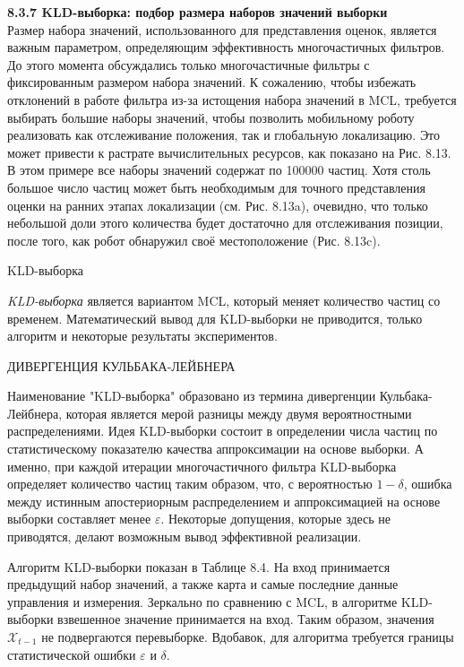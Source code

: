 \documentclass[10pt,a4paper]{article}
\begin{document}
\textbf{8.3.7	KLD-выборка: подбор размера наборов значений выборки}\\

Размер набора значений, использованного для представления оценок, является важным параметром, определяющим эффективность многочастичных фильтров. До этого момента обсуждались только многочастичные фильтры с фиксированным размером набора значений. К сожалению, чтобы избежать отклонений в работе фильтра из-за истощения набора значений в MCL, требуется выбирать большие наборы значений, чтобы позволить мобильному роботу реализовать как отслеживание положения, так и глобальную локализацию. Это может привести к растрате вычислительных ресурсов, как показано на Рис. 8.13. В этом примере все наборы значений содержат по 100000 частиц. Хотя столь большое число частиц может быть необходимым для точного представления оценки на ранних этапах локализации (см. Рис. 8.13a), очевидно, что только небольшой доли этого количества будет достаточно для отслеживания позиции, после того, как робот обнаружил своё местоположение (Рис. 8.13c).

KLD-выборка

\textit{KLD-выборка} является вариантом MCL, который меняет количество частиц со временем. Математический вывод для KLD-выборки не приводится, только алгоритм и некоторые результаты экспериментов. 

ДИВЕРГЕНЦИЯ КУЛЬБАКА-ЛЕЙБНЕРА 

Наименование "KLD-выборка" образовано из термина дивергенции Кульбака-Лейбнера, которая является мерой
разницы между двумя вероятностными распределениями. Идея KLD-выборки состоит в определении числа частиц по статистическому показателю качества аппроксимации на основе выборки. А именно, при каждой итерации многочастичного фильтра KLD-выборка определяет количество частиц таким образом, что, с вероятностью $1-\delta$, ошибка между истинным апостериорным распределением и аппроксимацией на основе выборки составляет менее $\varepsilon$. Некоторые допущения, которые здесь не приводятся, делают возможным вывод эффективной реализации. 

Алгоритм KLD-выборки показан в Таблице 8.4.  На вход принимается предыдущий набор значений, а также карта и самые последние данные управления и измерения. Зеркально по сравнению с MCL, в алгоритме KLD-выборки взвешенное значение принимается на вход. Таким образом, значения $\mathcal{X}_{t-1}$ не подвергаются перевыборке. Вдобавок, для алгоритма требуется границы статистической ошибки $\varepsilon$ и $\delta$.
\end{document}
